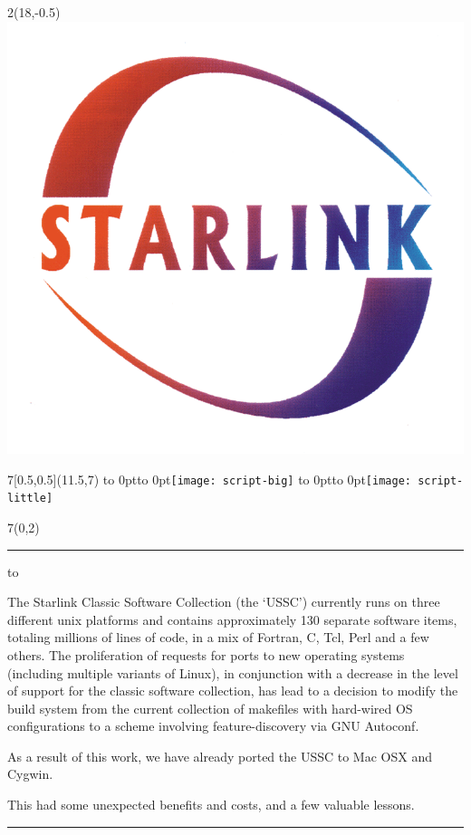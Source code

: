 \documentclass[a0]{a0poster}
\def\Head#1{\noindent\hbox to \hsize{\hfil{\LARGE\color{DarkBlue} #1}}\bigskip}
\begin{document}
\begin{textblock}{2}(18,-0.5)
\includegraphics{starlink_logo}
\end{textblock}

\begin{textblock}{7}[0.5,0.5](11.5,7)
\vbox to 0pt{\vss\hbox to 0pt{\hss\texttt{[image: script-big]}\hss}\vss}%
\vbox to 0pt{\vss\hbox to 0pt{\hss\texttt{[image: script-little]}\hss}\vss}%
\end{textblock}



\begin{textblock}{7}(0,2)
\hrule\medskip

\Head{Summary}

\slshape

The Starlink Classic Software Collection (the `USSC') currently runs
on three different unix platforms and contains approximately 130 separate
software items, totaling millions of lines of code, in a mix of
Fortran, C, Tcl, Perl and a few others. The proliferation of requests
for ports to
new operating systems (including multiple variants of Linux), in
conjunction with a decrease in the level of support for the classic
software collection, has lead to a decision to modify the build system
from the current collection of makefiles with hard-wired OS
configurations to a scheme involving feature-discovery via GNU
Autoconf.

As a result of this work, we have already ported the USSC to Mac OSX
and Cygwin. 

This had some unexpected benefits and costs, and a few valuable lessons.

\bigskip
\hrule
\end{textblock}
\end{document}
